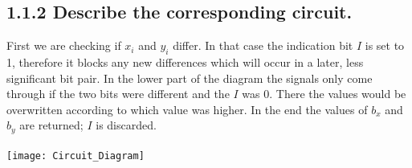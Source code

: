 \documentclass{article}
\begin{document}
\begin{adjustwidth}{2em}{2em}
		\subsection*{1.1.2 Describe the corresponding circuit.}
		\begin{adjustwidth}{2em}{}
			First we are checking if $x_i$ and $y_i$ differ. In that case the indication bit $I$ is set to 1, therefore it blocks any new differences which will occur in a later, less significant bit pair. In the lower part of the diagram the signals only come through if the two bits were different and the $I$ was 0. There the values would be overwritten according to which value was higher. In the end the values of $b_x$ and $b_y$ are returned; $I$ is discarded. \\ \\
			\texttt{[image: Circuit\_Diagram]}
		\end{adjustwidth}
	\end{adjustwidth}
	
\end{document}
